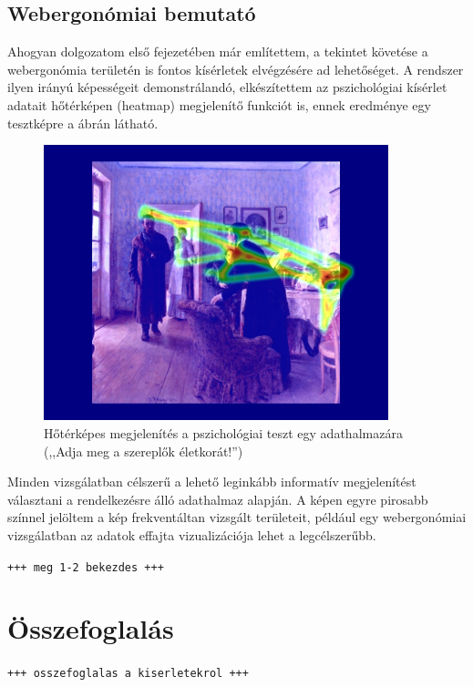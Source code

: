 \subsection{Webergonómiai bemutató}\label{sect:web}

Ahogyan dolgozatom első fejezetében már említettem, a tekintet követése a webergonómia területén is fontos kísérletek elvégzésére ad lehetőséget. A rendszer ilyen irányú képességeit demonstrálandó, elkészítettem az pszichológiai kísérlet adatait hőtérképen (heatmap) megjelenítő funkciót is, ennek eredménye egy tesztképre a  ábrán látható.

\begin{figure}[!ht]
\centering
\includegraphics[width=100mm, keepaspectratio]{figures/heatmap.jpg}
\caption{Hőtérképes megjelenítés a pszichológiai teszt egy adathalmazára (,,Adja meg a szereplők életkorát!'')}
\label{fig:heatmap}
\end{figure}

Minden vizsgálatban célszerű a lehető leginkább informatív megjelenítést választani a rendelkezésre álló adathalmaz alapján. A képen egyre pirosabb színnel jelöltem a kép frekventáltan vizsgált területeit, például egy webergonómiai vizsgálatban az adatok effajta vizualizációja lehet a legcélszerűbb.

\bigskip

\texttt{+++ meg 1-2 bekezdes +++}

\section{Összefoglalás}\label{sect:kiserlet_osszefoglalas}

\texttt{+++ osszefoglalas a kiserletekrol +++}